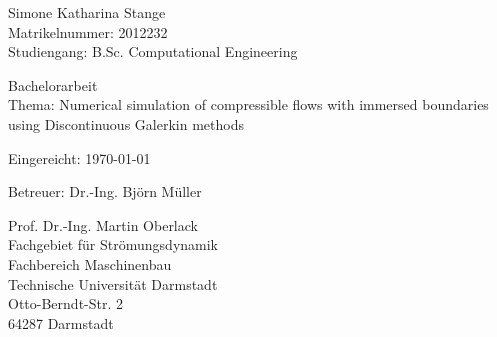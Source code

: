 \vspace*{14cm}
{\parindent0pt
Simone Katharina Stange\\
Matrikelnummer: 2012232 \\
Studiengang: B.Sc. Computational Engineering\newline
 
Bachelorarbeit\\
Thema: Numerical simulation of compressible flows with immersed boundaries using Discontinuous Galerkin methods\newline

Eingereicht: \today\newline

Betreuer: Dr.-Ing. Björn Müller \newline

Prof. Dr.-Ing. Martin Oberlack \\
Fachgebiet für Strömungsdynamik\\
Fachbereich Maschinenbau \\
Technische Universität Darmstadt \\
Otto-Berndt-Str. 2 \\
64287 Darmstadt}